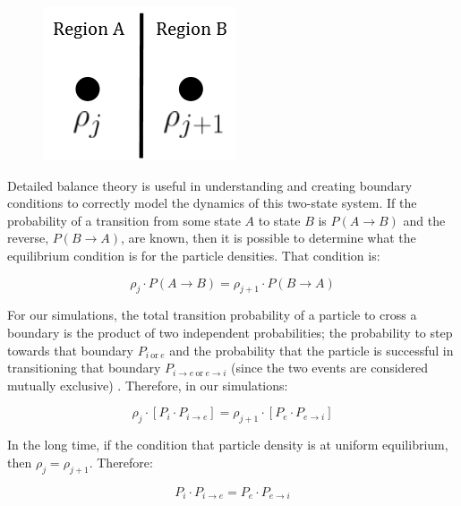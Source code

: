 	\begin{figure}[h]
		\centering
		\includegraphics[width=0.27\linewidth]{../images/balance}
		\caption[Detailed balance theory]{}
		\label{fig:balance}
	\end{figure}
 
	

	Detailed balance theory is useful in understanding and creating boundary conditions to correctly model the dynamics of this two-state system. If the probability of a transition from some state $ A $ to state $ B $ is $ P(A \rightarrow B) $ and the reverse, $ P(B \rightarrow A) $, are known, then it is possible to determine what the equilibrium condition is for the particle densities. That condition is:
	
	\begin{equation}
		\rho_{j} \cdot P(A \rightarrow B) = \rho_{j+1} \cdot P(B \rightarrow A)
	\end{equation}
	
	For our simulations, the total transition probability of a particle to cross a boundary is the product of two independent probabilities; the probability to step towards that boundary $ P_{i \: \textrm{or} \: e} $ and the probability that the particle is successful in transitioning that boundary $ P_{i \rightarrow e \: \textrm{or} \: e \rightarrow i} $ (since the two events are considered mutually exclusive) \citep{haan}. Therefore, in our simulations:
	
	\begin{equation}
		\rho_{j} \cdot \left[ P_{i} \cdot P_{i \rightarrow e} \right] = \rho_{j+1} \cdot \left[  P_{e} \cdot P_{e \rightarrow i} \right] 
	\end{equation}
	
	In the long time, if the condition that particle density is at uniform equilibrium, then  $\rho_{j} = \rho_{j+1} $. Therefore:
	
	\begin{equation}
		P_{i} \cdot P_{i \rightarrow e} = P_{e} \cdot P_{e \rightarrow i}
	\end{equation}
	
